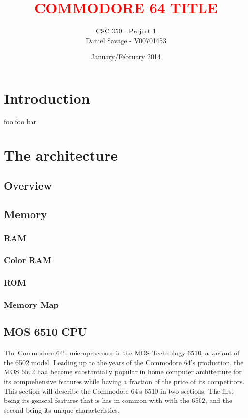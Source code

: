 \documentclass{article}
\title{\textcolor{red}{COMMODORE 64 TITLE}}
\author{CSC 350 - Project 1 \\ Daniel Savage - V00701453}
\date{January/February 2014}
\begin{document}
   \maketitle
   
\pagebreak{}

\tableofcontents

\pagebreak{}
   
\section{Introduction}
foo foo bar

\section{The architecture}

\subsection{Overview}

\subsection{Memory}

\subsubsection{RAM}

\subsubsection{Color RAM}

\subsubsection{ROM}

\subsubsection{Memory Map}

\subsection{MOS 6510 CPU}
\paragraph{}
The Commodore 64's microprocessor is the MOS Technology 6510, a variant of the 6502 model. Leading up to the years of the Commodore 64's production, the MOS 6502 had become substantially popular in home computer architecture for its comprehensive features while having a fraction of the price of its competitors. This section will describe the Commodore 64's 6510 in two sections. The first being its general features that is has in common with with the 6502, and the second being its unique characteristics.
\end{document}
